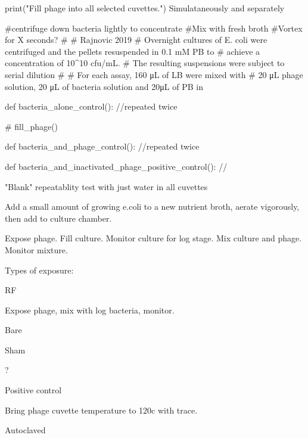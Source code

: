 \documentclass[paper.tex]{subfiles}%
\begin{document}
    print("Fill phage into all selected cuvettes.")
    Simulataneously and separately

#centrifuge down bacteria lightly to concentrate
#Mix with fresh broth
#Vortex for X seconds?
#
# Rajnovic 2019
# Overnight cultures of E. coli were centrifuged and the pellets resuspended in 0.1 mM PB to
# achieve a concentration of 10^10 cfu/mL.
# The resulting suspensions were subject to serial dilution
#
# For each assay, 160 μL of LB were mixed with
# 20 μL phage solution, 20 μL of bacteria solution and 20μL of PB in


def bacteria_alone_control():
    //repeated twice

    # fill_phage()


def bacteria_and_phage_control():
    //repeated twice


def bacteria_and_inactivated_phage_positive_control():
    //

"Blank" repeatablity test with just water in all cuvettes


Add a small amount of growing e.coli to a new nutrient broth,
aerate vigorously, then add to culture chamber.

Expose phage.
Fill culture.
Monitor culture for log stage.
Mix culture and phage.
Monitor mixture.

Types of exposure:

RF

Expose phage, mix with log bacteria, monitor.

Bare

Sham

?

Positive control

Bring phage cuvette temperature to 120c with trace.



Autoclaved
\end{document}
